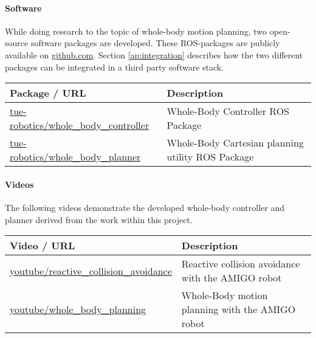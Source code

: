 \paragraph{Software}
While doing research to the topic of whole-body motion planning, two open-source software packages are developed. These ROS-packages are publicly available on \href{http://github.com}{github.com}. Section \ref{ap:integration} describes how the two different packages can be integrated in a third party software stack.
\begin{longtable}{|p{6cm}p{9cm}|}
\hline
\rowcolor[gray]{0.8} \bf Package / URL & \bf Description\\
\hline
\href{https://github.com/tue-robotics/amigo_whole_body_controller}{tue-robotics/whole\_body\_controller} & Whole-Body Controller ROS Package \\
\href{https://github.com/tue-robotics/whole_body_planner}{tue-robotics/whole\_body\_planner} & Whole-Body Cartesian planning utility ROS Package \\
\hline
\end{longtable}

\paragraph{Videos}
\label{videos}
The following videos demonstrate the developed whole-body controller and planner derived from the work within this project. 
\begin{longtable}{|p{6cm}p{9cm}|}
\hline
\rowcolor[gray]{0.8} \bf Video / URL & \bf Description\\
\hline
\href{https://www.youtube.com/watch?v=Fc9SOGC_sMA}{youtube/reactive\_collision\_avoidance} & Reactive collision avoidance with the AMIGO robot \\
\href{https://www.youtube.com/watch?v=Fc9SOGC_sMA}{youtube/whole\_body\_planning} & Whole-Body motion planning with the AMIGO robot\\
\hline
\end{longtable}

